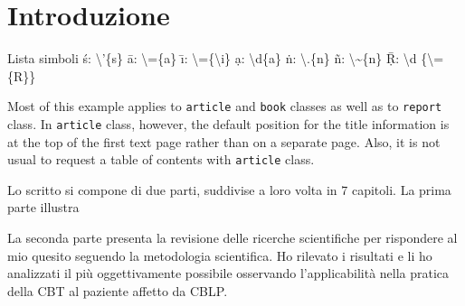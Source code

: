 



\chapter*{Introduzione} 



Lista simboli \newline
\'{s}:  \textbackslash'\{s\} \newline
\={a}: \textbackslash=\{a\} \newline
\={\i}: \textbackslash=\{\textbackslash i\}  \newline
\d{a}:  \textbackslash d\{a\} \newline
\.{n}:   \textbackslash.\{n\}  \newline
\~{n}:    \textbackslash\textasciitilde\{n\} \newline
\d{\={R}}: \textbackslash d \{\textbackslash=\{R\}\} \newline

Most of this example applies to \texttt{article} and \texttt{book} classes
as well as to \texttt{report} class. In \texttt{article} class, however,
the default position for the title information is at the top of
the first text page rather than on a separate page. Also, it is
not usual to request a table of contents with \texttt{article} class.

Lo scritto si compone di due parti, suddivise a loro volta in 7 capitoli.
La prima parte illustra 

La seconda parte presenta la revisione delle ricerche scientifiche per rispondere al mio quesito seguendo la metodologia scientifica.
Ho rilevato i risultati e li ho analizzati il più oggettivamente possibile osservando l’applicabilità nella pratica della CBT al paziente affetto da CBLP.